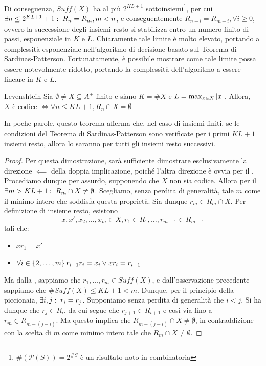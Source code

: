 Di conseguenza, \(Suff(X)\) ha al più \(2^{KL+1}\) sottoinsiemi\footnote{\(\#(\mathcal{P}(S)) = 2^{\#S}\) è un risultato noto in combinatoria}, per cui \(\exists n \leq 2^{KL+1} +1 :\; R_n = R_m, m < n\), e conseguentemente \(R_{n+i} = R_{m+i}, \forall i \geq 0\), ovvero la successione degli insiemi resto si stabilizza entro un numero finito di passi, esponenziale in \(K\) e \(L\).
Chiaramente tale limite è molto elevato, portando a complessità esponenziale nell'algoritmo di decisione basato sul Teorema di Sardinas-Patterson.
Fortunatamente, è possibile mostrare come tale limite possa essere notevolmente ridotto, portando la complessità dell'algoritmo a essere lineare in \(K\) e \(L\).

\begin{theorem}{Levenshtein}
  Sia \(\emptyset \neq X \subseteq A^+\) finito e siano \(K = \# X\) e \(L = \max_{x \in X} \left|x\right|\).
  Allora, \(X \text{ è codice } \iff \forall n \leq KL +1, R_n \cap X = \emptyset\)
\end{theorem}

In poche parole, questo teorema afferma che, nel caso di insiemi finiti, se le condizioni del Teorema di Sardinas-Patterson sono verificate per i primi \(KL+1\) insiemi resto, allora lo saranno per tutti gli insiemi resto successivi.

\begin{proof}
  Per questa dimostrazione, sarà sufficiente dimostrare esclusivamente la direzione \(\impliedby\) della doppia implicazione, poiché l'altra direzione è ovvia per il .
  Procediamo dunque per assurdo, supponendo che \(X\) non sia codice. Allora per il  \(\exists m > KL + 1 :\; R_m \cap X \neq \emptyset\).
  Scegliamo, senza perdita di generalità, tale \(m\) come il minimo intero che soddisfa questa proprietà.
  Sia dunque \(r_m \in R_m \cap X\). Per definizione di insieme resto, esistono 
  \[x,x',x_2,\ldots,x_m \in X, r_1\in R_1,\ldots,r_{m-1} \in R_{m-1}\]
  tali che:
  \begin{itemize}
    \item \(xr_1=x'\) 
    \item \(\forall i \in \set{2,\ldots,m} r_{i-1}r_i=x_i \lor xr_i = r_{i-1}\)
  \end{itemize}
  Ma dalla , sappiamo che \(r_1,\ldots,r_m \in Suff(X)\), e dall'osservazione precedente sappiamo che \(\# Suff(X) \leq KL + 1 < m\).
  Dunque, per il principio della piccionaia, \(\exists i,j :\; r_i=r_j\). Supponiamo senza perdita di generalità che \(i<j\).
  Si ha dunque che \(r_j \in R_i\), da cui segue che \(r_{j+1} \in R_{i+1}\) e così via fino a \(r_m \in R_{m-(j-i)}\).
  Ma questo implica che \(R_{m-(j-i)} \cap X \neq \emptyset\), in contraddizione con la scelta di \(m\) come minimo intero tale che \(R_m \cap X \neq \emptyset\).
\end{proof}

